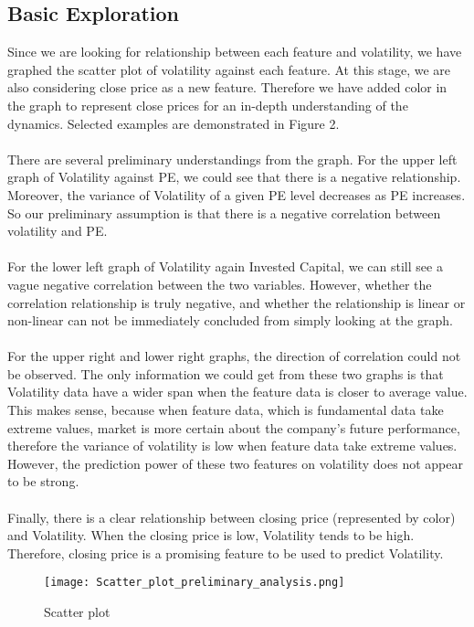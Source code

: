 \documentclass[a4paper]{article}
\begin{document}
\subsection{Basic Exploration}
Since we are looking for relationship between each feature and volatility, we have graphed the scatter plot of volatility against each feature. At this stage, we are also considering close price as a new feature. Therefore we have added color in the graph to represent close prices for an in-depth understanding of the dynamics. Selected examples are demonstrated in Figure 2.
\\\\There are several preliminary understandings from the graph. For the upper left graph of Volatility against PE, we could see that there is a negative relationship. Moreover, the variance of Volatility of a given PE level decreases as PE increases. So our preliminary assumption is that there is a negative correlation between volatility and PE. 
\\\\For the lower left graph of Volatility again Invested Capital, we can still see a vague negative correlation between the two variables. However, whether the correlation relationship is truly negative, and whether the relationship is linear or non-linear can not be immediately concluded from simply looking at the graph.
\\\\For the upper right and lower right graphs, the direction of correlation could not be observed. The only information we could get from these two graphs is that Volatility data have a wider span when the feature data is closer to average value. This makes sense, because when feature data, which is fundamental data take extreme values, market is more certain about the company's future performance, therefore the variance of volatility is low when feature data take extreme values. However, the prediction power of these two features on volatility does not appear to be strong.
\\\\Finally, there is a clear relationship between closing price (represented by color) and Volatility. When the closing price is low, Volatility tends to be high. Therefore, closing price is a promising feature to be used to predict Volatility.

\begin{figure}
\centering
\texttt{[image: Scatter\_plot\_preliminary\_analysis.png]}
\caption{\label{fig:scatter plot}Scatter plot}
\end{figure}
\end{document}

